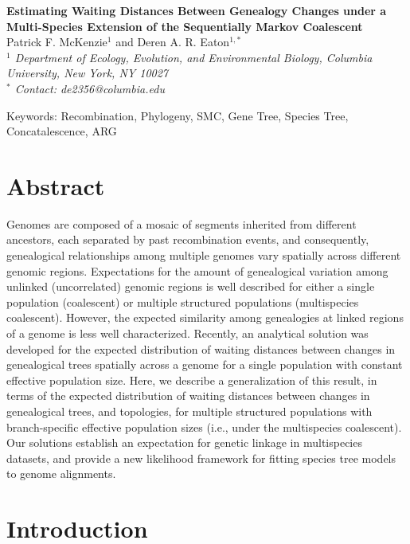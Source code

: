 \documentclass[11pt]{article}
\begin{document}
\begin{center}
	{\bf \Large
		Estimating Waiting Distances Between Genealogy Changes under a \\[0.25cm]
		Multi-Species Extension of the Sequentially Markov Coalescent
	}\\[0.5cm]

	Patrick F. McKenzie$^{1}$ and Deren A. R. Eaton$^{1, *}$\\[0.25cm]

	\emph{
	$^{1}$ Department of Ecology, Evolution, and Environmental Biology, Columbia University, New York, NY 10027\\[0.5cm]
	$^{*}$ Contact: de2356@columbia.edu\\[0.5cm]
	}
\end{center}

Keywords: Recombination, Phylogeny, SMC, Gene Tree, Species Tree, Concatalescence, ARG

\RaggedRight

\section*{Abstract}
Genomes are composed of a mosaic of segments inherited from different ancestors, 
each separated by past recombination events, and consequently, genealogical
relationships among multiple genomes vary spatially across different genomic 
regions. Expectations for the amount of genealogical variation among unlinked 
(uncorrelated) genomic regions is well described for either a single 
population (coalescent) or multiple structured populations (multispecies coalescent).
However, the expected similarity among genealogies at linked regions of a 
genome is less well characterized. 
Recently, an analytical solution was developed for the expected 
distribution of waiting distances between changes in genealogical trees 
spatially across a genome for a single population with constant effective 
population size. Here, we describe a generalization of this 
result, in terms of the expected distribution of waiting distances between 
changes in genealogical trees, and topologies, for multiple structured populations
with branch-specific effective population sizes (i.e., under the multispecies 
coalescent). Our solutions establish an expectation for genetic linkage  
in multispecies datasets, and provide a new likelihood framework for 
fitting species tree models to genome alignments.

\section{Introduction}
\end{document}
